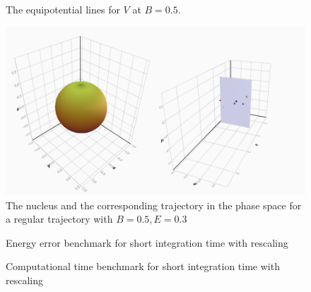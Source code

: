 \documentclass{beamer}
\begin{document}

\begin{frame}
	\begin{figure}
		
		\caption{The equipotential lines for \(V\) at \(B=0.5\).}
	\end{figure}
\end{frame}


\begin{frame}
	\begin{figure}
		\includegraphics[width=\textwidth]{nucleus-with-poincare}
		\caption{The nucleus and the corresponding trajectory in the phase space
		for a regular trajectory with \(B=0.5, E=0.3\)}
	\end{figure}
\end{frame}


\begin{frame}
	\begin{figure}
		
		\caption{Energy error benchmark for short integration time with rescaling}
	\end{figure}
\end{frame}


\begin{frame}
	\begin{figure}
		
		\caption{Computational time benchmark for short integration time with rescaling}
	\end{figure}
\end{frame}
\end{document}
